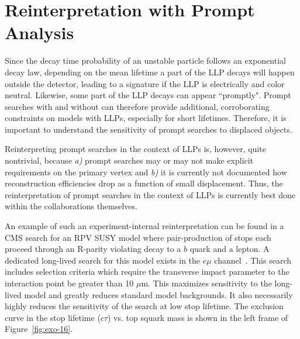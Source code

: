 
\section{Reinterpretation with Prompt Analysis}\label{sec:ch5-recastingPrompt}



Since the decay time probability of an unstable particle follows an
exponential decay law, depending on the mean lifetime a part of the LLP
decays will happen outside the detector, leading to a \MET signature if the LLP is
electrically and color neutral. Likewise, some part of the LLP decays
can appear ``promptly". Prompt searches with and without \MET can
therefore provide additional, corroborating constraints on models with
LLPs, especially for short lifetimes. Therefore, it is important to
understand the sensitivity of prompt searches to displaced objects.

Reinterpreting prompt searches in the context of LLPs is, however,
quite nontrivial, because {\it a)} prompt searches may or may not make
explicit requirements on the primary vertex and {\it b)} it is
currently not documented how reconstruction efficiencies drop as a
function of small displacement. Thus, the reinterpretation of prompt
searches in the context of LLPs is currently best done within the
collaborations themselves.


An example of such an experiment-internal reinterpretation can be found in a CMS
search for an RPV SUSY model where pair-production of stops each proceed through
an R-parity violating decay to a $b$ quark and a lepton. A dedicated long-lived
search for this model exists in the $e\mu$ channel~\cite{CMS:2016isf}.
This search includes selection criteria which require the transverse impact
parameter to the interaction point be greater than 10 $\mu$m. This maximizes
sensitivity to the long-lived model and greatly reduces standard model
backgrounds. It also necessarily highly reduces the sensitivity of the search at
low stop lifetime. The exclusion curve in the stop lifetime ($c\tau$) vs. top
squark mass is shown in the left frame of Figure~\ref{fig:exo-16}.

